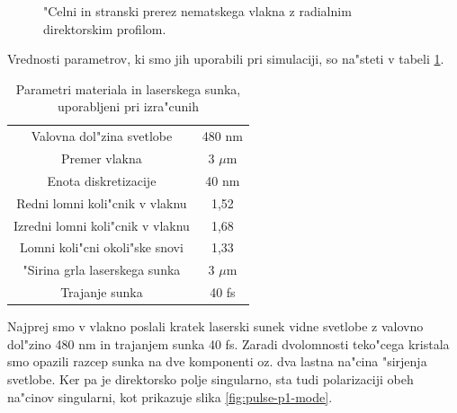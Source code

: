\documentclass[12pt,twoside,openright,final]{report}
\begin{document}
\begin{figure}[!ht]
\centering
{}
\caption{"Celni in stranski prerez nematskega vlakna z radialnim direktorskim profilom. }
\label{fig:fibre-radial-profile}
\end{figure}

Vrednosti parametrov, ki smo jih uporabili pri simulaciji, so na"steti v tabeli \ref{tab:parametri}. 

\begin{table}[!htb]
\centering
 \begin{tabular}{|c|c|}
  \hline
  Valovna dol"zina svetlobe & 480 nm \\
  Premer vlakna & 3 $\mu$m \\
  Enota diskretizacije & 40 nm \\
  \hline
  Redni lomni koli"cnik v vlaknu & 1,52 \\
  Izredni lomni koli"cnik v vlaknu & 1,68 \\
  Lomni koli"cni okoli"ske snovi & 1,33 \\
  \hline
  "Sirina grla laserskega sunka & 3 $\mu$m \\
  Trajanje sunka & 40 fs \\
  \hline
 \end{tabular}
 \vspace{2mm}
 \caption{Parametri materiala in laserskega sunka, uporabljeni pri izra"cunih}
 \label{tab:parametri}
\end{table}

Najprej smo v vlakno poslali kratek laserski sunek vidne svetlobe z valovno dol"zino 480 nm in trajanjem sunka 40 fs. 
Zaradi dvolomnosti teko"cega kristala smo opazili razcep sunka na dve komponenti oz. dva lastna na"cina "sirjenja svetlobe. 
Ker pa je direktorsko polje singularno, sta tudi polarizaciji obeh na"cinov singularni, kot prikazuje slika \ref{fig:pulse-p1-mode}. 
\end{document}
